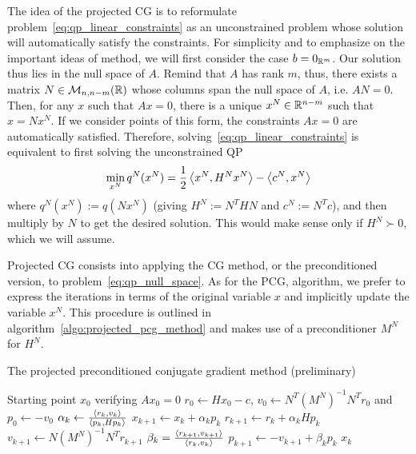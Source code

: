 \documentclass[10pt]{article}
\numberwithin{equation}{section}
\begin{document}
	 The idea of the projected CG is to reformulate problem~\eqref{eq:qp_linear_constraints} as an unconstrained problem whose solution will automatically satisfy the constraints. For simplicity and to emphasize on the important ideas of method, we will first consider the case $b=0_{{\mathbb{R}}^m}$. Our solution thus lies in the null space of $A$. Remind that $A$ has rank $m$, thus, there exists a matrix $N\in {\mathcal{M}}_{n,n-m}({\mathbb{R}})$ whose columns span the null space of $A$, i.e. $AN=0$. Then, for any $x$ such that $Ax=0$, there is a unique $x^N \in {\mathbb{R}}^{n-m}$ such that $x = Nx^N$. If we consider points of this form, the constraints $Ax=0$ are automatically satisfied. Therefore, solving~\eqref{eq:qp_linear_constraints} is equivalent to first solving the unconstrained QP
	  \begin{equation}\label{eq:qp_null_space}
	 		\min_{x^N} q^N(x^N) = \dfrac{1}{2} \left\langle {x^N} , {H^Nx^N} \right\rangle - \left\langle {c^N} , {x^N} \right\rangle
	 \end{equation}
	 where $q^N(x^N) := q(Nx^N)$ (giving $H^N:=N^THN$ and $c^N:=N^Tc$), and then multiply by $N$ to get the desired solution. This would make sense only if $H^N \succ 0$, which we will assume.
	 
	 Projected CG consists into applying the CG method, or the preconditioned version, to problem~\eqref{eq:qp_null_space}.	As for the PCG, algorithm, we prefer to express the iterations in terms of the original variable $x$ and implicitly update the variable $x^N$. This procedure is outlined in algorithm~\ref{algo:projected_pcg_method} and makes use of a preconditioner $M^N$ for $H^N$.
	 
	 \begin{algorithm}
	 	\caption{The projected preconditioned conjugate gradient method (preliminary)}\label{algo:preliminary_projected_pcg_method}
	 	\begin{algorithmic}
	 		\Require Starting point $x_0$ verifying $Ax_0=0$
	 		\State $r_0 \gets Hx_0-c$, $v_0\gets N^T(M^N)^{-1}N^Tr_0$ and $p_0 \gets -v_0$
	 		\State $\alpha_k \gets \frac{\left\langle {r_k} , {v_k} \right\rangle}{\left\langle {p_k} , {Hp_k} \right\rangle}$
	 			\State $x_{k+1} \gets x_k+\alpha_kp_k$
	 			\State $r_{k+1} \gets r_k + \alpha_kHp_k$
	 			\State $v_{k+1}\gets N{(M^N)}^{-1}N^Tr_{k+1}$
	 			\State $\beta_k =  \frac{\left\langle {r_{k+1}} , {v_{k+1}} \right\rangle}{\left\langle {r_k} , {v_k} \right\rangle}$
	 			\State $p_{k+1} \gets -v_{k+1}+\beta_kp_k$
	 			\EndFor{}
	 			\Return $x_k$
	 		\end{algorithmic}
	 	\end{algorithm} 
	 
\end{document}
